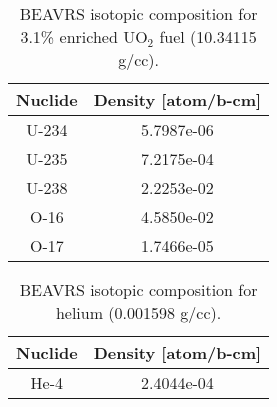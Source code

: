 \begin{appendices}
\begin{table}[h!]
  \centering
  \caption[BEAVRS isotopic composition for 3.1\% enriched UO$_2$]{BEAVRS isotopic composition for 3.1\% enriched UO$_2$ fuel (10.34115 g/cc).}
  \footnotesize
  \label{table:chap7-beavrs-isotopes-3.1-uo2}
  \vspace{6pt}
  \begin{tabular}{c c}
  \toprule
  \rowcolor{lightgray}
  {\bf Nuclide} &
  {\bf Density [atom/b-cm]} \\
  \midrule
  U-234 & 5.7987e-06 \\
  U-235 & 7.2175e-04 \\
  U-238 & 2.2253e-02 \\
  O-16 & 4.5850e-02 \\
  O-17 & 1.7466e-05 \\
  \bottomrule
\end{tabular}
\end{table}

\begin{table}[h!]
  \centering
  \caption[BEAVRS isotopic composition for helium]{BEAVRS isotopic composition for helium (0.001598 g/cc).}
  \footnotesize
  \label{table:chap7-beavrs-isotopes-3.1-helium}
  \vspace{6pt}
  \begin{tabular}{c c}
  \toprule
  \rowcolor{lightgray}
  {\bf Nuclide} &
  {\bf Density [atom/b-cm]} \\
  \midrule
  He-4 & 2.4044e-04 \\
  \bottomrule
\end{tabular}
\end{table}


\end{appendices}
